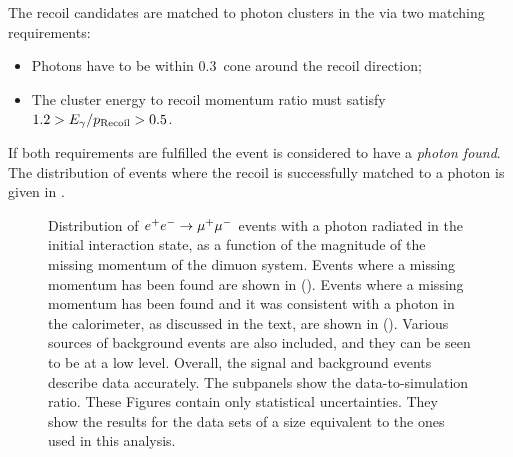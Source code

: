 The recoil candidates are matched to photon clusters in the \ECL via two matching requirements:
\begin{itemize}
    \item Photons have to be within 0.3~\rad cone around the recoil direction;
    \item The cluster energy to recoil momentum ratio must satisfy $1.2>E_{\gamma}/{p_{\mathrm{Recoil}}}>0.5$.
\end{itemize}
If both requirements are fulfilled the event is considered to have a \textit{photon found}.
The distribution of events where the recoil is successfully matched to a photon is given in .
\begin{figure}[hbtp!]
    \centering
    \caption{\label{fig:normalisation_data_mc} Distribution of $e^+e^-\rightarrow\mu^+\mu^-$ events with a photon radiated in the initial interaction state, as a function of the magnitude of the missing momentum of the dimuon system.
    Events where a missing momentum has been found are shown in ().
    Events where a missing momentum has been found and it was consistent with a photon in the calorimeter, as discussed in the text, are shown in ().
    Various sources of background events are also included, and they can be seen to be at a low level.
    Overall, the signal and background events describe data accurately.
    The subpanels show the data-to-simulation ratio.
    These Figures contain only statistical uncertainties.
    They show the results for the data sets of a size equivalent to the ones used in this analysis.
    }
\end{figure}

